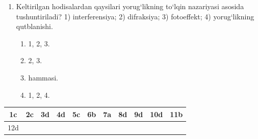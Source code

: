\begin{enumerate}
\item Keltirilgan hodisalardan qaysilari yorug‘likning to‘lqin nazariyasi asosida tushuntiriladi?
1) interferensiya; 2) difraksiya; 3) fotoeffekt; 4) yorug‘likning qutblanishi.
\begin{enumerate}[label=\Alph*)]
\item 1, 2, 3.
\item 2, 3.
\item hammasi.
\item 1, 2, 4.
\end{enumerate}

\end{enumerate}




\begin{table}[!ht]
\centering
\begin{tabular}{|c|c|c|c|c|c|c|c|c|c|c|}
\hline
1c & 2c & 3d & 4d & 5c & 6b & 7a & 8d & 9d & 10d & 11b \\ \hline
12d & & & & & & & & & & \\ \hline
\end{tabular}
\end{table}